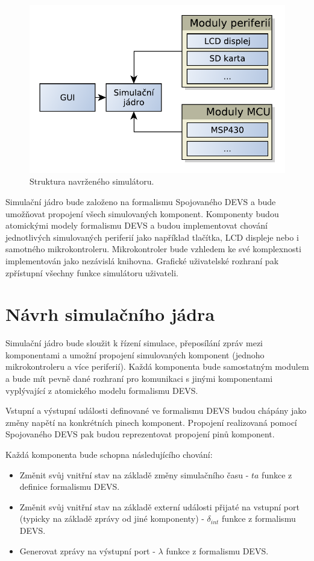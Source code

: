 \begin{figure}[ht]
\centering
\includegraphics[trim=0cm 0cm 0cm 0cm, scale=0.7]{fig/struktura}
\caption{Struktura navrženého simulátoru.}
\label{fig:struktura}
\end{figure}

Simulační jádro bude založeno na formalismu Spojovaného DEVS a bude umožňovat propojení všech simulovaných komponent. Komponenty budou atomickými modely formalismu DEVS a budou implementovat chování jednotlivých simulovaných periferií jako například tlačítka, LCD displeje nebo i samotného mikrokontroleru. Mikrokontroler bude vzhledem ke své komplexnosti implementován jako nezávislá knihovna. Grafické uživatelské rozhraní pak zpřístupní všechny funkce simulátoru uživateli.

\section{Návrh simulačního jádra}

Simulační jádro bude sloužit k řízení simulace, přeposílání zpráv mezi komponentami a umožní propojení simulovaných komponent (jednoho mikrokontroleru a více periferií). Každá komponenta bude samostatným modulem a bude mít pevně dané rozhraní pro komunikaci s jinými komponentami vyplývající z atomického modelu formalismu DEVS.

Vstupní a výstupní události definované ve formalismu DEVS budou chápány jako změny napětí na konkrétních pinech komponent. Propojení realizovaná pomocí Spojovaného DEVS pak budou reprezentovat propojení pinů komponent.

Každá komponenta bude schopna následujícího chování:

\begin{itemize}
\item Změnit svůj vnitřní stav na základě změny simulačního času - $ta$ funkce z definice formalismu DEVS.
\item Změnit svůj vnitřní stav na základě externí události přijaté na vstupní port (typicky na základě zprávy od jiné komponenty) - $\delta_{int}$ funkce z formalismu DEVS.
\item Generovat zprávy na výstupní port - $\lambda$ funkce z formalismu DEVS.
\end{itemize}

